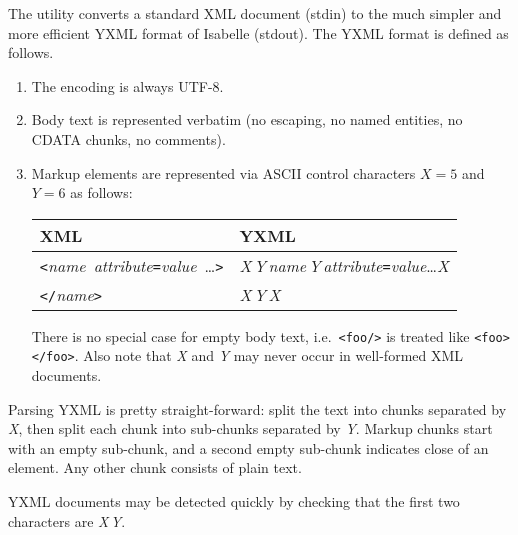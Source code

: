 The  utility converts a standard XML document (stdin) to
the much simpler and more efficient YXML format of Isabelle (stdout).
The YXML format is defined as follows.

\begin{enumerate}

\item The encoding is always UTF-8.

\item Body text is represented verbatim (no escaping, no named
  entities, no CDATA chunks, no comments).

\item Markup elements are represented via ASCII control characters $X
  = 5$ and $Y = 6$ as follows:

  \begin{tabular}{ll}
    XML & YXML \\\hline
    \verb,<,\emph{name}~\emph{attribute}\verb,=,\emph{value}~\dots\verb,>, &
    \emph{X\,Y\,name\,Y\,attribute}\verb,=,\emph{value}\dots\emph{X} \\
    \verb,</,\emph{name}\verb,>, & \emph{X\,Y\,X} \\
  \end{tabular}

  There is no special case for empty body text, i.e.\ \verb,<foo/>, is
  treated like \verb,<foo></foo>,.  Also note that \emph{X} and
  \emph{Y} may never occur in well-formed XML documents.

\end{enumerate}

Parsing YXML is pretty straight-forward: split the text into chunks
separated by \emph{X}, then split each chunk into sub-chunks separated
by \emph{Y}.  Markup chunks start with an empty sub-chunk, and a
second empty sub-chunk indicates close of an element.  Any other chunk
consists of plain text.

YXML documents may be detected quickly by checking that the first two
characters are \emph{X\,Y}.

